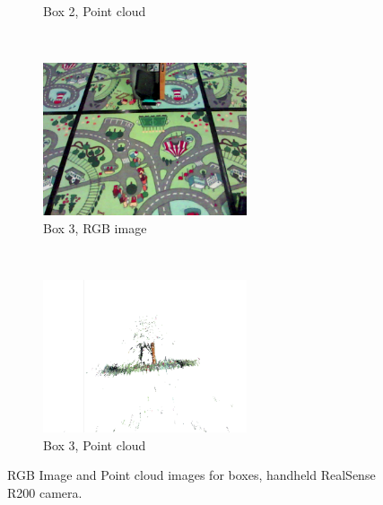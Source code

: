 \documentclass[12pt,a4paper]{article}
\begin{document}
\begin{figure}[p]
\begin{subfigure}[t]{0.5\textwidth}
      \caption{Box 2, Point cloud}
      \end{subfigure}
      \\
      \begin{subfigure}[t]{0.5\textwidth}
      \centering
        \includegraphics[width=60mm]{box_test/cpp-headless-output-118_4_16_2_0_59_1526436059005.png}
      \caption{Box 3, RGB image}
      \end{subfigure}%
      ~
      \begin{subfigure}[t]{0.5\textwidth}
      \centering
        \includegraphics[width=60mm, trim =50mm 50mm 50mm 50mm, clip]{box_test/no_vicon1_281.png}
      \caption{Box 3, Point cloud}
      \end{subfigure}
      \caption{RGB Image and Point cloud images for boxes, handheld RealSense R200 camera.}
      \label{f: box pcs}
    \end{figure}
\end{document}
